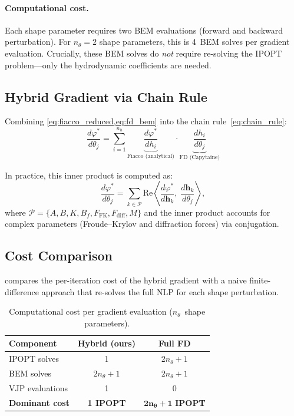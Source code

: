 \documentclass[11pt,a4paper]{article}
\newcommand{\vp}{\varphi}
\newcommand{\bh}{\bm{h}}
\newcommand{\dd}[2]{\frac{d #1}{d #2}}
\begin{document}
\paragraph{Computational cost.}
Each shape parameter requires two BEM evaluations (forward and
backward perturbation).  For $n_\theta = 2$ shape parameters, this
is 4~BEM solves per gradient evaluation.  Crucially, these BEM
solves do \emph{not} require re-solving the IPOPT problem---only
the hydrodynamic coefficients are needed.

\subsection{Hybrid Gradient via Chain Rule}
\label{sec:hybrid}

Combining \cref{eq:fiacco_reduced,eq:fd_bem} into the chain
rule~\eqref{eq:chain_rule}:
\begin{equation}
\label{eq:hybrid}
\boxed{
    \dd{\vp^*}{\theta_j}
    = \sum_{i=1}^{n_h}
      \underbrace{\dd{\vp^*}{h_i}}_{\text{Fiacco (analytical)}}
      \cdot
      \underbrace{\dd{h_i}{\theta_j}}_{\text{FD (Capytaine)}}
}
\end{equation}

In practice, this inner product is computed as:
\begin{equation}
    \dd{\vp^*}{\theta_j}
    = \sum_{k \in \mathcal{P}}
      \mathrm{Re}\!\left\langle
        \dd{\vp^*}{\bh_k},\;
        \dd{\bh_k}{\theta_j}
      \right\rangle,
\end{equation}
where $\mathcal{P} = \{A, B, K, B_f, F_{\mathrm{FK}},
F_{\mathrm{diff}}, M\}$ and the inner product accounts for complex
parameters (Froude--Krylov and diffraction forces) via conjugation.

\subsection{Cost Comparison}
\label{sec:cost}

 compares the per-iteration cost of the hybrid
gradient with a naive finite-difference approach that re-solves the
full NLP for each shape perturbation.

\begin{table}[ht]
\centering
\caption{Computational cost per gradient evaluation
         ($n_\theta$~shape parameters).}
\label{tab:cost}
\begin{tabular}{lcc}
\toprule
\textbf{Component} & \textbf{Hybrid (ours)} & \textbf{Full FD} \\
\midrule
IPOPT solves    & 1                      & $2n_\theta + 1$ \\
BEM solves      & $2n_\theta + 1$        & $2n_\theta + 1$ \\
VJP evaluations & 1                      & 0 \\
\midrule
\textbf{Dominant cost} & \textbf{1 IPOPT} & $\bm{2n_\theta + 1}$ \textbf{IPOPT} \\
\bottomrule
\end{tabular}
\end{table}
\end{document}
